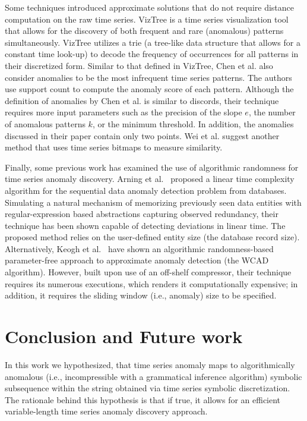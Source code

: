\documentclass{sig-alternate}
\begin{document}
Some techniques introduced approximate solutions that do not require distance computation on the raw time series. VizTree \cite{viztree} is a time series visualization tool that allows for the discovery of both frequent and rare (anomalous) patterns simultaneously. VizTree utilizes a trie (a tree-like data structure that allows for a constant time look-up) to decode the frequency of occurrences for all patterns in their discretized form. Similar to that defined in VizTree, Chen et al.\cite{ano_pattern} also consider anomalies to be the most infrequent time series patterns. The authors use support count to compute the anomaly score of each pattern. Although the definition of anomalies by Chen et al. is similar to discords, their technique requires more input parameters such as the precision of the slope $e$, the number of anomalous patterns $k$, or the minimum threshold. In addition, the anomalies discussed in their paper contain only two points. Wei et al. \cite{bitmaps} suggest another method that uses time series bitmaps to measure similarity. 

Finally, some previous work has examined the use of algorithmic randomness for time series anomaly discovery. Arning et al.~\cite{regex} proposed a linear time complexity algorithm for the sequential data anomaly detection problem from databases. Simulating a natural mechanism of memorizing previously seen data entities with regular-expression based abstractions capturing observed redundancy, their technique has been shown capable of detecting deviations in linear time. The proposed method relies on the user-defined entity size (the database record size). Alternatively, Keogh et al.~\cite{param_free} have shown an algorithmic randomness-based para\-meter-free approach to approximate anomaly detection (the WCAD algorithm). However, built upon use of an off-shelf compressor, their technique requires its numerous executions, which renders it computationally expensive; in addition, it requires the sliding window (i.e., anomaly) size to be specified.

\section{Conclusion and Future work}
In this work we hypothesized, that time series anomaly maps to algorithmically anomalous (i.e., incompressible with a grammatical inference algorithm) symbolic subsequence within the string obtained via time series symbolic discretization. The rationale behind this hypothesis is that if true, it allows for an efficient variable-length time series anomaly discovery approach.
\end{document}
